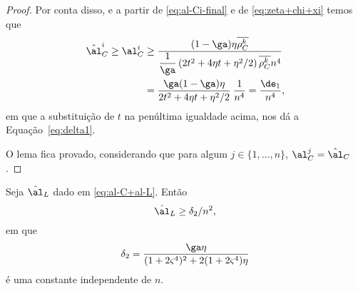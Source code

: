 \begin{proof}
Por conta disso, e a partir  de \eqref{eq:al-Ci-final} e de \eqref{eq:zeta+chi+xi} temos que 
\[
\begin{aligned}
\nextal_{C}^i \geq \al_{C}^{i} & \geq \dfrac{(1-\ga)\eta\rhoCkb}{\dfrac{1}{\ga}\left( 2t^{2} + 4\eta t + \eta^{2}/2 \right)\rhoCkb n^{4} } \\			 
							& = \dfrac{\ga(1-\ga)\eta}{ 2t^{2} + 4\eta t + \eta^{2}/2 } \:\dfrac{1}{n^{4}} = \dfrac{\de_{1}}{n^{4}},
\end{aligned}
\]
em que a substituição de $t$ na penúltima igualdade acima, nos dá a Equação~\eqref{eq:delta1}.

 O lema fica provado, considerando que para algum $j\in\{1,\ldots,n\}$, $ \al_{C}^{j}=\nextal_{C} $.
 \end{proof}






\begin{lema}\label{lemma:alL_delta-2}
Seja $\nextal_{L}$ dado em \eqref{eq:al-C+al-L}. Então 
\[
\nextal_{L} \geq \delta_{2}/n^{2},
\]em que 
\begin{equation}
	\label{eq:delta2}
	\delta_{2} = \dfrac{\ga\eta } {(1 + 2\bdxzstar^{4})^{2}  + 2(1+2\bdxzstar^{4})\eta}
\end{equation}
é uma constante independente de $n$.
\end{lema}


